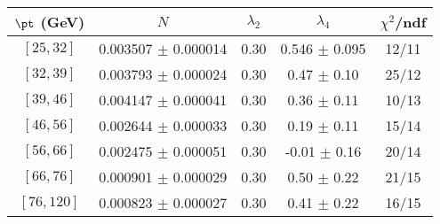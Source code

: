 \begin{tabular}{c||c|c|c|c}
$\pt$ (GeV) & $N$ & $\lambda_{2}$ & $\lambda_4$  & $\chi^2$/ndf  \\
\hline
$[25, 32]$ & 0.003507 $\pm$ 0.000014 & 0.30 & 0.546 $\pm$ 0.095 & 12/11\\
$[32, 39]$ & 0.003793 $\pm$ 0.000024 & 0.30 & 0.47 $\pm$ 0.10 & 25/12\\
$[39, 46]$ & 0.004147 $\pm$ 0.000041 & 0.30 & 0.36 $\pm$ 0.11 & 10/13\\
$[46, 56]$ & 0.002644 $\pm$ 0.000033 & 0.30 & 0.19 $\pm$ 0.11 & 15/14\\
$[56, 66]$ & 0.002475 $\pm$ 0.000051 & 0.30 & -0.01 $\pm$ 0.16 & 20/14\\
$[66, 76]$ & 0.000901 $\pm$ 0.000029 & 0.30 & 0.50 $\pm$ 0.22 & 21/15\\
$[76, 120]$ & 0.000823 $\pm$ 0.000027 & 0.30 & 0.41 $\pm$ 0.22 & 16/15\\
\end{tabular}
